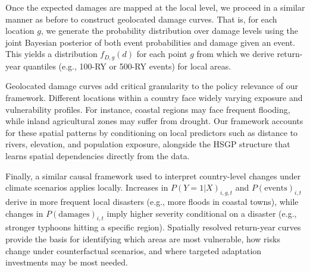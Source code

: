 Once the expected damages are mapped at the local level, we proceed in a similar manner as before to construct geolocated damage curves. That is, for each location $g$, we generate the probability distribution over damage levels using the joint Bayesian posterior of both event probabilities and damage given an event. This yields a distribution $f_{D,g}(d)$ for each point $g$ from which we derive return-year quantiles (e.g., 100-RY or 500-RY events) for local areas.

Geolocated damage curves add critical granularity to the policy relevance of our framework. Different locations within a country face widely varying exposure and vulnerability profiles. For instance, coastal regions may face frequent flooding, while inland agricultural zones may suffer from drought. Our framework accounts for these spatial patterns by conditioning on local predictors such as distance to rivers, elevation, and population exposure, alongside the HSGP structure that learns spatial dependencies directly from the data.

Finally, a similar causal framework used to interpret country-level changes under climate scenarios applies locally. Increases in $P(Y=1|X)_{i,g,t}$ and $P(\text{events})_{i,t}$ derive in more frequent local disasters (e.g., more floods in coastal towns), while changes in $P(\text{damages})_{i,t}$ imply higher severity conditional on a disaster (e.g., stronger typhoons hitting a specific region). Spatially resolved return-year curves provide the basis for identifying which areas are most vulnerable, how risks change under counterfactual scenarios, and where targeted adaptation investments may be most needed.

\newpage
